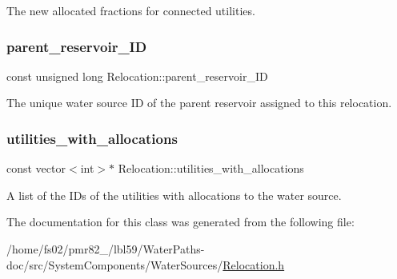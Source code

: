 The new allocated fractions for connected utilities. 

\mbox{\label{classRelocation_a61282254064f00641aaec667a7eb0652}} 
\subsubsection{\texorpdfstring{parent\+\_\+reservoir\+\_\+\+ID}{parent\_reservoir\_ID}}
{\footnotesize\ttfamily const unsigned long Relocation\+::parent\+\_\+reservoir\+\_\+\+ID}



The unique water source ID of the parent reservoir assigned to this relocation. 

\mbox{\label{classRelocation_ae426f390487b6b67f19bfbf556c922c2}} 
\subsubsection{\texorpdfstring{utilities\+\_\+with\+\_\+allocations}{utilities\_with\_allocations}}
{\footnotesize\ttfamily const vector$<$int$>$$\ast$ Relocation\+::utilities\+\_\+with\+\_\+allocations}



A list of the I\+Ds of the utilities with allocations to the water source. 



The documentation for this class was generated from the following file\+:\begin{DoxyCompactItemize}
\item 
/home/fs02/pmr82\+\_/lbl59/\+Water\+Paths-\/doc/src/\+System\+Components/\+Water\+Sources/\mbox{\hyperlink{Relocation_8h}{Relocation.\+h}}\end{DoxyCompactItemize}
